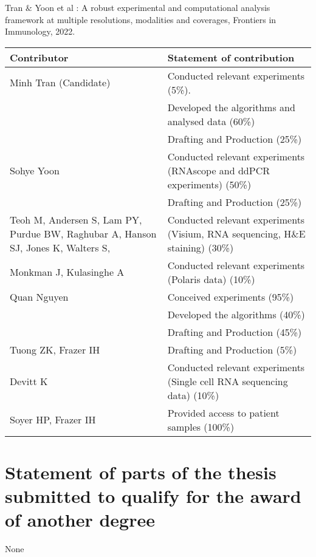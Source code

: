 \begin{instructional}
	Tran $\&$ Yoon et al \cite{tran2022robust}: A robust experimental and computational analysis framework at multiple resolutions, modalities and coverages, Frontiers in Immunology, 2022. 
\begin{table}[ht]	
\begin{tabularx}{\textwidth}{|X|X|} 
 \hline
 Contributor & Statement of contribution \\ 
 \hline\hline
 Minh Tran (Candidate) & Conducted relevant experiments (5\%). \\ 
 & Developed the algorithms and analysed data (60\%)  \\ 
 & Drafting and Production (25\%) \\
 \hline
 Sohye Yoon & Conducted relevant experiments (RNAscope and ddPCR experiments) (50\%)   \\
 & Drafting and Production (25\%) \\
 \hline
 Teoh M, Andersen S, Lam PY, Purdue BW, Raghubar A, Hanson SJ, Jones K, Walters S,  & Conducted relevant experiments (Visium, RNA sequencing, H$\&$E staining) (30\%) \\
 \hline
 Monkman J, Kulasinghe A & Conducted relevant experiments (Polaris data) (10\%) \\
 \hline
 Quan Nguyen & Conceived experiments (95\%) \\
  & Developed the algorithms (40\%) \\
  & Drafting and Production (45\%) \\
 \hline
 Tuong ZK, Frazer IH & Drafting and Production (5\%) \\
 \hline
 Devitt K & Conducted relevant experiments (Single cell RNA sequencing data) (10\%) \\
 \hline
 Soyer HP, Frazer IH & Provided access to patient samples (100\%)  \\ [1ex] 
 \hline
\end{tabularx}
\end{table} 
\end{instructional}





\pagebreak
\section*{Statement of parts of the thesis submitted to qualify for the award of another degree}
None

